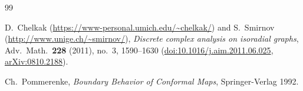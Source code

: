 \documentclass[]{amsart}
\numberwithin{equation}{section}
\begin{document}
\begin{thebibliography}{99}

 D.~Chelkak (\url{https://www-personal.umich.edu/~chelkak/}) and S.~Smirnov (\url{http://www.unige.ch/~smirnov/}), {\em Discrete complex analysis on isoradial graphs}, Adv.\ Math.\ \textbf{228} (2011), no.~3, 1590--1630 (\href{https://doi.org/10.1016/j.aim.2011.06.025}{doi:10.1016/j.aim.2011.06.025}, \href{https://arxiv.org/abs/0810.2188}{arXiv:0810.2188}).


 Ch.~Pommerenke, {\em Boundary Behavior of Conformal Maps\/},
Springer-Verlag 1992.

\end{thebibliography}
 
\end{document}
